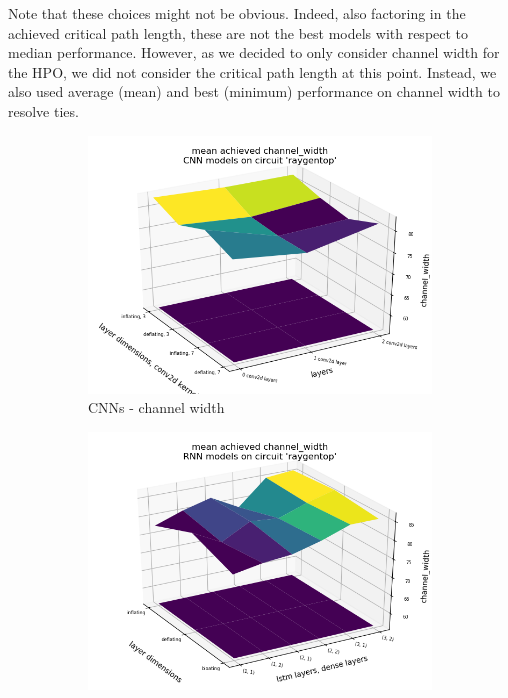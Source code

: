 Note that these choices might not be obvious. Indeed, also factoring in the achieved critical path length, these are not the best models with respect to median performance. However, as we decided to only consider channel width for the \gls{HPO}, we did not consider the critical path length at this point. Instead, we also used average (mean) and best (minimum) performance on channel width to resolve ties.

\begin{figure}
	\begin{subfigure}[b]{0.45\linewidth}
		\includegraphics[width=\linewidth]{plots/cnn-hyperopt-chan-width-with-reference.png}
		\caption{\glspl{CNN} - channel width}
	\end{subfigure}
	\begin{subfigure}[b]{0.45\linewidth}
		\includegraphics[width=\linewidth]{plots/rnn-hyperopt-chan-width-with-reference.png}

\end{subfigure}
\end{figure}
